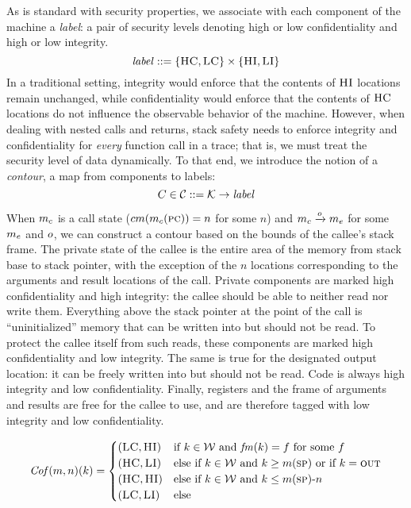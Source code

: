 \documentclass[acmsmall,review,anonymous]{acmart}\settopmatter{printfolios=true,printccs=false,printacmref=false}
\begin{document}
As is standard with security properties, we associate with each
component of the machine a {\em label}: a pair of security levels
denoting high or low confidentiality and high or low integrity.
%
\[\mathit{label} ::= \{\textsc{HC},\textsc{LC}\} \times \{\textsc{HI},\textsc{LI}\}\]
%
In a traditional setting, integrity would enforce that the contents of
$\textsc{HI}$ locations remain unchanged, while confidentiality would
enforce that the contents of $\textsc{HC}$ locations do not influence the
observable behavior of the machine. However, when dealing with nested
calls and returns, stack safety needs to enforce integrity and
confidentiality for {\em every} function call in a trace; that is, we
must treat the security level of data dynamically.
%
To that end, we introduce the notion of a {\em contour}, a map from
components to labels:
%
\[C \in {\mathcal C} ::= {\mathcal K} \rightarrow \mathit{label}\]

When \(m_c\) is a call state (\(cm(m_c(\textsc{pc})) = n\) for some $n$) and
\(m_c \xrightarrow{o} m_e\) for some
$m_e$ and $o$, we can construct a contour based on the bounds of the
callee's stack frame.
%
The private state of the callee is the entire area of the memory from
stack base to stack pointer, with the exception of the $n$ locations
corresponding to the arguments and result locations of the
call. Private components are marked high confidentiality and high
integrity: the callee should be able to neither read nor write them.
%
Everything above the stack pointer at the point of the call is
``uninitialized'' memory that can be written into but should not be
read. To protect the callee itself from such reads, these components
are marked high confidentiality and low integrity.
%
The same is true for the designated output location: it can be
freely written into but should not be read.
%
Code is always high integrity and low confidentiality.
%
Finally, registers and the frame of arguments and results are free
for the callee to use, and are therefore tagged with low integrity and
low confidentiality.

 \[\mathit{Cof}(m,n)(k) =
  \begin{cases}
    (\textsc{LC},\textsc{HI}) & \text{if } k \in {\mathcal W}
                         \text{ and } \mathit{fm}(k) = f \text{ for some }f\\
    (\textsc{HC},\textsc{LI}) & \text{else if } k \in {\mathcal W}
                          \text{ and } k \geq m(\textsc{sp})
                          \text{ or if } k = \textsc{out}\\
    (\textsc{HC},\textsc{HI}) & \text{else if } k \in {\mathcal W}
                          \text{ and } k \leq m(\textsc{sp}) \textrm{-}  n \\
    (\textsc{LC},\textsc{LI}) & \text{else} \\
  \end{cases}\]
\end{document}
